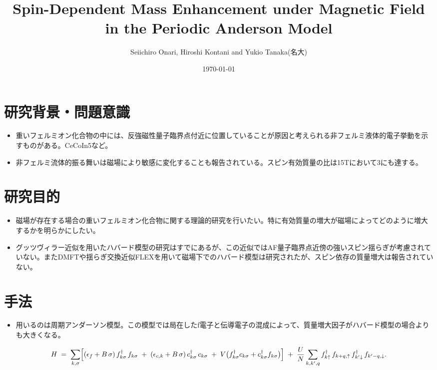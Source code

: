 \documentclass[a4paper,12pt]{jarticle}
\title{Spin-Dependent Mass Enhancement under Magnetic Field in the Periodic Anderson
Model}
\author{Seiichiro Onari, Hiroshi Kontani and Yukio Tanaka(名大)}
\date{\today}
\begin{document}
\maketitle

\section*{研究背景・問題意識}
\begin{itemize}
    \item 重いフェルミオン化合物の中には、反強磁性量子臨界点付近に位置していることが原因と考えられる非フェルミ液体的電子挙動を示すものがある。CeCoIn5など。
    \item 非フェルミ流体的振る舞いは磁場により敏感に変化することも報告されている。スピン有効質量の比は15Tにおいて3にも達する。
\end{itemize}

\section*{研究目的}
\begin{itemize}
    \item 磁場が存在する場合の重いフェルミオン化合物に関する理論的研究を行いたい。特に有効質量の増大が磁場によってどのように増大するかを明らかにしたい。
    \item グッツヴィラー近似を用いたハバード模型の研究はすでにあるが、この近似ではAF量子臨界点近傍の強いスピン揺らぎが考慮されていない。またDMFTや揺らぎ交換近似FLEXを用いて磁場下でのハバード模型は研究されたが、スピン依存の質量増大は報告されていない。
\end{itemize}

\section*{手法}
\begin{itemize}
    \item 用いるのは周期アンダーソン模型。この模型では局在したf電子と伝導電子の混成によって、質量増大因子がハバード模型の場合よりも大きくなる。
\end{itemize}

\begin{equation}
    \label{eq:H}
    H \;=\;
    \sum_{k,\sigma}
    \Bigl[
    (\epsilon_f + B\,\sigma)\,f_{k\sigma}^{\dagger}\,f_{k\sigma}
    \;+\;
    (\epsilon_{c,k} + B\,\sigma)\,c_{k\sigma}^{\dagger}\,c_{k\sigma}
    \;+\;
    V \bigl(f_{k\sigma}^{\dagger} c_{k\sigma} + c_{k\sigma}^{\dagger} f_{k\sigma}\bigr)
    \Bigr]
    \;+\;
    \frac{U}{N}
    \sum_{k,k',q}
    f_{k\uparrow}^{\dagger}\,f_{k+q,\uparrow}\,
    f_{k'\downarrow}^{\dagger}\,f_{k'-q,\downarrow}.
\end{equation}
\end{document}
